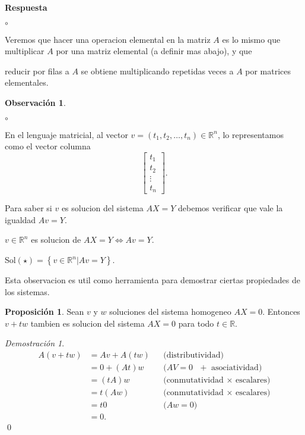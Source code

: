 \documentclass{article}
\theoremstyle{definition}
\theoremstyle{definition}
\newtheorem*{obs}{Observación}
\newtheorem{prop}[teo]{Proposición}
\theoremstyle{remark}
\newtheorem*{demo}{Demostración}
\begin{document}
\textbf{Respuesta} \begin{list}{$\circ$}{}  
\item Veremos que hacer una operacion elemental en la matriz $A$ es lo mismo que multiplicar $A$ por una matriz elemental (a definir mas abajo), y que 
\item reducir por filas a $A$ se obtiene multiplicando repetidas veces a $A$ por matrices elementales.
\end{list}
\begin{obs} \;
\begin{list}{$\circ$}{}  
\item En el lenguaje matricial, al vector $v=(t_1,t_2, \dots,t_n) \in \mathbb{R}^n$, lo representamos como el vector columna \[
    \begin{bmatrix} t_1 \\ t_2 \\ \vdots \\ t_n \end{bmatrix}.
  \]
\item Para saber si $v$ es solucion del sistema $AX=Y$ debemos verificar que vale la igualdad $Av=Y$. 
\item \quad \quad  $v \in \mathbb{R}^n$ es solucion de $AX=Y \Longleftrightarrow Av =Y$.
\item \quad \quad Sol$(\star)=\left\{v \in \mathbb{R}^n | Av=Y\right\}.$
\end{list}
\end{obs}
Esta observacion es util como herramienta para demostrar ciertas propiedades de los sistemas. 
\begin{prop}
  Sean $v$ y $w$ soluciones del sistema homogeneo $AX=0$. Entonces $v+tw$ tambien es solucion del sistema $AX=0$ para todo $t \in \mathbb{R}$.
\end{prop}
\begin{demo}%
\begin{align*}
  A(v+tw)&=Av+A(tw) &&\text{(distributividad)}\\
         &=0+(At)w &&\text{($AV=0$ $+$ asociatividad)} \\
         &= (tA)w && \text{(conmutatividad $\times$ escalares)} \\
         &= t(Aw) &&\text{(conmutatividad $\times$ escalares)} \\
         &= t0 &&\text{($Aw=0$)} \\
         &= 0.
  \end{align*} \qed
\end{demo}\pagebreak 
\end{document}
